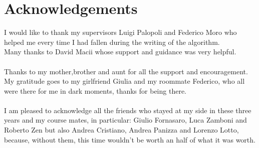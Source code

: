 \chapter*{Acknowledgements}
\thispagestyle{empty}

I would like to thank my supervisors Luigi Palopoli and Federico Moro who helped me every time I had fallen during the writing of the algorithm.
\\
Many thanks to David Macii whose support and guidance was very helpful.
\\ \\
Thanks to my mother,brother and aunt for all the support and encouragement.
\\
My gratitude goes to my girlfriend Giulia and my roommate Federico, who all were there for me in dark moments, thanks for being there.
\\ \\ 
I am pleased to acknowledge all the friends who stayed at my side in these three years and my course mates, in particular:
Giulio Fornasaro, Luca Zamboni and Roberto Zen but also Andrea Cristiano, Andrea Panizza and Lorenzo Lotto, because, without them, this time wouldn't be worth an half of what it was worth.

